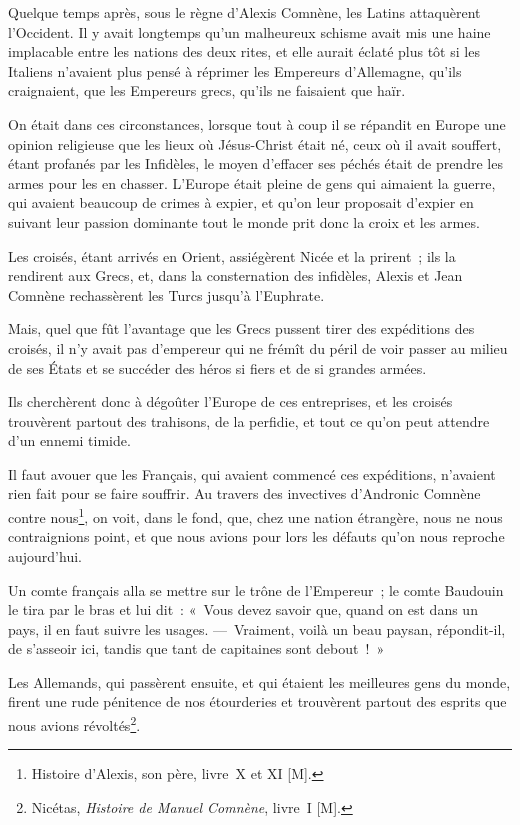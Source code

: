 \documentclass[french,twoside]{book} %
\begin{document}
Quelque temps après, sous le règne d’Alexis Comnène, les Latins attaquèrent l’Occident. Il y avait longtemps qu’un malheureux schisme avait mis une haine implacable entre les nations des deux rites, et elle aurait éclaté plus tôt si les Italiens n’avaient plus pensé à réprimer les Empereurs d’Allemagne, qu’ils craignaient, que les Empereurs grecs, qu’ils ne faisaient que haïr.\par
On était dans ces circonstances, lorsque tout à coup il se répandit en Europe une opinion religieuse que les lieux où Jésus-Christ était né, ceux où il avait souffert, étant profanés par les Infidèles, le moyen d’effacer ses péchés était de prendre les armes pour les en chasser. L’Europe était pleine de gens qui aimaient la guerre, qui avaient beaucoup de crimes à expier, et qu’on leur proposait d’expier en suivant leur passion dominante tout le monde prit donc la croix et les armes.\par
Les croisés, étant arrivés en Orient, assiégèrent Nicée et la prirent ; ils la rendirent aux Grecs, et, dans la consternation des infidèles, Alexis et Jean Comnène rechassèrent les Turcs jusqu’à l’Euphrate.\par
Mais, quel que fût l’avantage que les Grecs pussent tirer des expéditions des croisés, il n’y avait pas d’empereur qui ne frémît du péril de voir passer au milieu de ses États et se succéder des héros si fiers et de si grandes armées.\par
Ils cherchèrent donc à dégoûter l’Europe de ces entreprises, et les croisés trouvèrent partout des trahisons, de la perfidie, et tout ce qu’on peut attendre d’un ennemi timide.\par
Il faut avouer que les Français, qui avaient commencé ces expéditions, n’avaient rien fait pour se faire souffrir. Au travers des invectives d’Andronic Comnène contre nous\footnote{Histoire d’Alexis, son père, livre X et XI [M].}, on voit, dans le fond, que, chez une nation étrangère, nous ne nous contraignions point, et que nous avions pour lors les défauts qu’on nous reproche aujourd’hui.\par
Un comte français alla se mettre sur le trône de l’Empereur ; le comte Baudouin le tira par le bras et lui dit : « Vous devez savoir que, quand on est dans un pays, il en faut suivre les usages. — Vraiment, voilà un beau paysan, répondit-il, de s’asseoir ici, tandis que tant de capitaines sont debout ! »\par
Les Allemands, qui passèrent ensuite, et qui étaient les meilleures gens du monde, firent une rude pénitence de nos étourderies et trouvèrent partout des esprits que nous avions révoltés\footnote{Nicétas, {\itshape Histoire de Manuel Comnène}, livre I [M].}.\par
\end{document}
